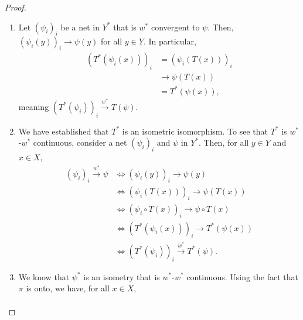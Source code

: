 \documentclass[10pt]{mypackage}
\begin{document}
\begin{proof}\hfill
  \begin{enumerate}[(1)]
    \item Let $\left(\psi_i\right)_i$ be a net in $Y^{\ast}$ that is $w^{\ast}$ convergent to $\psi$. Then, $\left(\psi_i\left(y\right)\right)_i\rightarrow \psi\left(y\right)$ for all $y\in Y$. In particular,
      \begin{align*}
        \left(T^{\ast}\left(\psi_i\left(x\right)\right)\right)_i  &= \left(\psi_i\left(T\left(x\right)\right)\right)_i\\
                                                                  &\rightarrow \psi\left(T\left(x\right)\right)\\
                                                                  &= T^{\ast}\left(\psi\left(x\right)\right),
      \end{align*}
      meaning $\left(T^{\ast}\left(\psi_i\right)\right)_i\xrightarrow{w^{\ast}} T\left(\psi\right) $.
    \item We have established that $T^{\ast}$ is an isometric isomorphism. To see that $T^{\ast}$ is $w^{\ast}$-$w^{\ast}$ continuous, consider a net $\left(\psi_i\right)_i$ and $\psi$ in $Y^{\ast}$. Then, for all $y\in Y$ and $x\in X$,
      \begin{align*}
        \left(\psi_i\right)_i\xrightarrow{w^{\ast}}\psi &\Leftrightarrow \left(\psi_i\left(y\right)\right)_i\rightarrow \psi\left(y\right)\\
                                                        &\Leftrightarrow \left(\psi_i\left(T\left(x\right)\right)\right)_i \rightarrow \psi\left(T\left(x\right)\right)\\
                                                        &\Leftrightarrow \left(\psi_i\circ T\left(x\right)\right)_i \rightarrow \psi\circ T\left(x\right)\\
                                                        &\Leftrightarrow \left(T^{\ast}\left(\psi_i\left(x\right)\right)\right)_i\rightarrow T^{\ast}\left(\psi\left(x\right)\right)\\
                                                        &\Leftrightarrow \left(T^{\ast}\left(\psi_i\right)\right)_i\xrightarrow{w^{\ast}}T^{\ast}\left(\psi\right).
      \end{align*}
    \item We know that $\psi^{\ast}$ is an isometry that is $w^{\ast}$-$w^{\ast}$ continuous. Using the fact that $\pi$ is onto, we have, for all $x\in X$,
      \begin{align*}

\end{align*}
\end{enumerate}
\end{proof}
\end{document}

